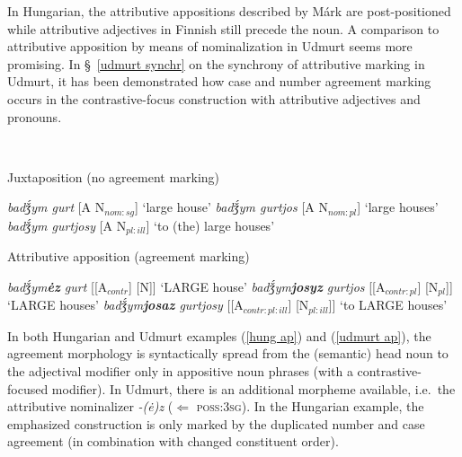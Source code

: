 {In Hungarian, the attributive appositions described by Márk are post-positioned while attributive adjectives in Finnish still precede the noun. A comparison to attributive apposition by means of nominalization in Udmurt seems more promising. In \S~\ref{udmurt synchr} on the synchrony of attributive marking in Udmurt, it has been demonstrated how case and number agreement marking occurs in the contrastive-focus construction with attributive adjectives and pronouns.
\begin{exe} \label{udmurt ap}
\ex {}\\
\begin{xlist}
\ex 	Juxtaposition (no agreement marking)
\begin{xlist}
\ex	\textit{badǯ́ym gurt} [A N$_{nom:sg}$] ‘large house’
\ex	\textit{badǯ́ym gurtjos} [A N$_{nom:pl}$] ‘large houses’
\ex	\textit{badǯ́ym gurtjosy} [A N$_{pl:ill}$] ‘to (the) large houses’
\end{xlist}
\ex	Attributive apposition (agreement marking)
\begin{xlist}
\ex	\textit{badǯ́ym\textbf{ėz} gurt} [[A$_{contr}$] [N]] ‘LARGE house’
\ex	\textit{badǯ́ym\textbf{josyz} gurtjos} [[A$_{contr:pl}$] [N$_{pl}$]] ‘LARGE houses’
\ex	\textit{badǯ́ym\textbf{josaz} gurtjosy} [[A$_{contr:pl:ill}$] [N$_{pl:ill}$]] ‘to LARGE houses’
\end{xlist}
\end{xlist}
\end{exe}
In both Hungarian and Udmurt examples (\ref{hung ap}) and (\ref{udmurt ap}), the agreement morphology is syntactically spread from the (semantic) head noun to the adjectival modifier only in appositive noun phrases (with a contrastive-focused modifier). In Udmurt, there is an additional morpheme available, i.e.~the attributive nominalizer \textit{-(ė)z} ($\Leftarrow$ \textsc{poss:3sg}). In the Hungarian example, the emphasized construction is only marked by the duplicated number and case agreement (in combination with changed constituent order).

}
